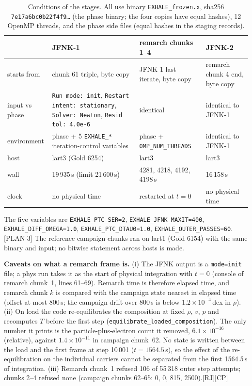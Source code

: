 \documentclass[english,a4paper]{my_memo}
\newcommand{\ev}[1]{\textnormal{\small[#1]}}
\begin{document}
\begin{table}[!htbp]
\centering\small
\caption{Conditions of the stages. All use binary \texttt{EXHALE\_frozen.x},
sha256 \texttt{7e17a6bc0b22f4f9\ldots} (the phase binary; the four copies have equal hashes),
12 OpenMP threads, and the phase side files (equal hashes in the staging records).}
\label{tab:cond}
\begin{tabular}{p{}p{}p{}p{}}
\toprule
 & JFNK-1 & remarch chunks 1--4 & JFNK-2 \\
\midrule
starts from & chunk 61 triple, byte copy & JFNK-1 last iterate, byte copy & remarch chunk 4 end, byte copy \\
input vs phase & \texttt{Run mode: init}, \texttt{Restart intent: stationary}, \texttt{Solver: Newton}, \texttt{Resid tol: 4.0e-6} & identical & identical to JFNK-1 \\
environment & phase + 5 \texttt{EXHALE\_*} iteration-control variables & phase + \texttt{OMP\_NUM\_THREADS} & identical to JFNK-1 \\
host & lart3 (Gold 6254) & lart3 & lart3 \\
wall & 19\,935\,s (limit 21\,600\,s) & 4281, 4218, 4192, 4198\,s & 16\,158\,s \\
clock & no physical time & restarted at $t=0$ & no physical time \\
\bottomrule
\end{tabular}
\end{table}
The five variables are \texttt{EXHALE\_PTC\_SER=2}, \texttt{EXHALE\_JFNK\_MAXIT=400},
\texttt{EXHALE\_DIFF\_OMEGA=1.0}, \texttt{EXHALE\_PTC\_DTAU0=1.0},
\texttt{EXHALE\_OUTER\_PASSES=60}.\ev{PLAN 3} The reference campaign chunks
ran on lart1 (Gold 6154) with the same binary and input; no bitwise
statement across hosts is made.

\textbf{Caveats on what a remarch frame is.}
(i) The JFNK output is a \texttt{mode=init} file; a phys run takes it as the
start of physical integration with $t=0$ (console of remarch chunk~1, lines
61--69). Remarch time is therefore elapsed time, and remarch chunk $k$ is
compared with the campaign state nearest in elapsed time (offset at most
800\,s; the campaign drift over 800\,s is below $1.2\times10^{-4}$\,dex in $\rho$).
(ii) On load the code re-equilibrates the composition at fixed $\rho$, $v$,
$p$ and recomputes $T$ before the first step
(\texttt{equilibrate\_loaded\_composition}). The only number it prints is
the particle-plus-electron count it removed, $6.1\times10^{-16}$
(relative), against $1.4\times10^{-11}$ in campaign chunk~62. No state is
written between the load and the first frame at step 10\,001
($t=1564.5$\,s), so the effect of the re-equilibration on the individual
carriers cannot be separated from the first 1564.5\,s of integration.
(iii) Remarch chunk~1 refused 106 of 55\,318 outer step attempts; chunks
2--4 refused none (campaign chunks 62--65: 0, 0, 815, 2500).\ev{RJ}\ev{CP}
\end{document}
